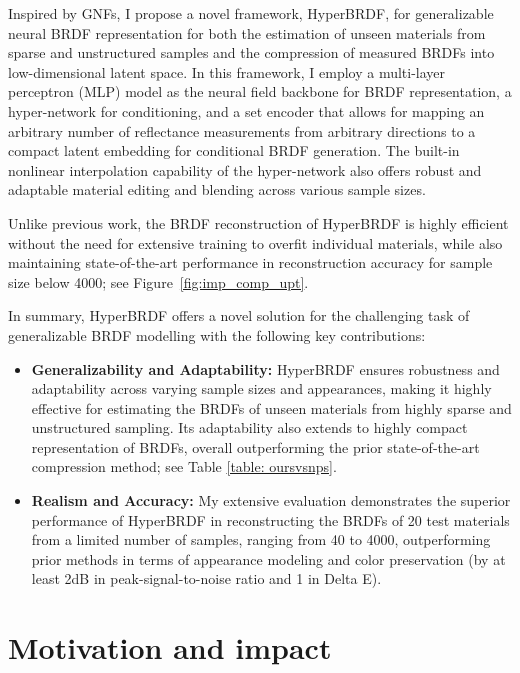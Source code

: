 Inspired by GNFs, I propose a novel framework, HyperBRDF, for generalizable neural BRDF representation for both the estimation of unseen materials from sparse and unstructured samples and the compression of measured BRDFs into low-dimensional latent space. In this framework, I employ a multi-layer perceptron (MLP) model as the neural field backbone for BRDF representation, a hyper-network for conditioning, and a set encoder that allows for mapping an arbitrary number of reflectance measurements from arbitrary directions to a compact latent embedding for conditional BRDF generation. 
The built-in nonlinear interpolation capability of the hyper-network also offers robust and adaptable material editing and blending across various sample sizes.


Unlike previous work, the BRDF reconstruction of HyperBRDF is highly efficient without the need for extensive training to overfit individual materials, while also maintaining state-of-the-art performance in reconstruction accuracy for sample size below 4000; see Figure~\ref{fig:imp_comp_upt}.


In summary, HyperBRDF offers a novel solution for the challenging task of generalizable BRDF modelling with the following key contributions:
\begin{itemize}
    \item{\textbf{Generalizability and Adaptability:} HyperBRDF ensures robustness and adaptability across varying sample sizes and appearances, making it highly effective for estimating the BRDFs of unseen materials from highly sparse and unstructured sampling. Its adaptability also extends to highly compact representation of BRDFs, overall outperforming the prior state-of-the-art compression method; see Table \ref{table: oursvsnps}.}
    

    \item{\textbf{Realism and Accuracy:}
    My extensive evaluation demonstrates the superior performance of HyperBRDF in reconstructing the BRDFs of 20 test materials from a limited number of samples, ranging from 40 to 4000, outperforming prior methods in terms of appearance modeling and color preservation (by at least 2dB in peak-signal-to-noise ratio and 1 in Delta E).
    }
\end{itemize}

\section{Motivation and impact}
\label{sec:hyperbrdf-mot}


